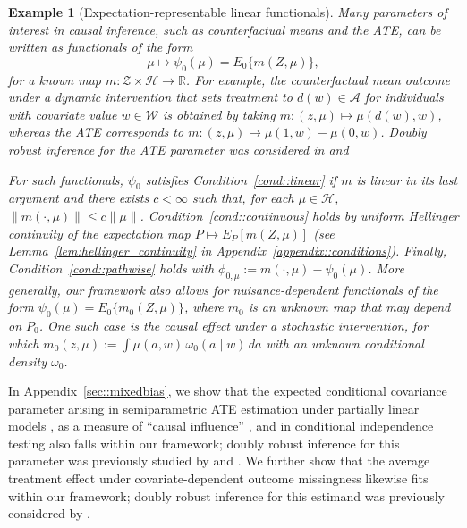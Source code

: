 \documentclass[11pt]{article}
\theoremstyle{plain}
\newtheorem{example}{Example}
\begin{document}
 
 
 {\color{purple}

\begin{example}[Expectation-representable linear functionals]
\label{example::expectfunctional}
Many parameters of interest in causal inference, such as counterfactual means and the ATE, can be written as functionals of the form \citep{chernozhukov2022automatic, bradic2019minimax, rotnitzky2021characterization}
\begin{equation}
    \mu \mapsto \psi_0(\mu) = E_0\{m(Z,\mu)\}, \label{eqn::simplefunctional}
\end{equation}
for a known map $m:\mathcal{Z}\times\mathcal{H}\to\mathbb{R}$. For example, the counterfactual mean outcome under a dynamic intervention that
sets treatment to $d(w)\in\mathcal{A}$ for individuals with covariate value
$w\in\mathcal{W}$ is obtained by taking $m:(z,\mu)\mapsto \mu(d(w),w)$, whereas
the ATE corresponds to $m:(z,\mu)\mapsto \mu(1,w)-\mu(0,w)$. Doubly robust inference for the ATE parameter was considered in \cite{van2014targeted} and \cite{benkeser2017doubly}


For such functionals, $\psi_0$ satisfies Condition~\ref{cond::linear} if $m$ is linear in its last argument and there exists $c<\infty$ such that, for each $\mu\in\mathcal{H}$, $\|m(\cdot,\mu)\|\le c\|\mu\|$. Condition~\ref{cond::continuous} holds by uniform Hellinger continuity of the expectation map $P \mapsto E_P[m(Z,\mu)]$ (see Lemma~\ref{lem:hellinger_continuity} in Appendix~\ref{appendix::conditions}). Finally, Condition~\ref{cond::pathwise} holds with $\phi_{0,\mu}:=m(\cdot,\mu)-\psi_0(\mu)$. More generally, our framework also allows for nuisance-dependent functionals of the form $\psi_0(\mu)=E_0\{m_0(Z,\mu)\}$, where $m_0$ is an unknown map that may depend on $P_0$. One such case is the causal effect under a stochastic intervention, for which $m_0(z,\mu) := \int \mu(a,w)\,\omega_0(a\mid w)\,da$ with an unknown conditional density $\omega_0$.
\end{example}

  }

In Appendix~\ref{sec::mixedbias}, we show that the expected conditional covariance parameter
arising in semiparametric ATE estimation under partially linear models
\citep{robinson1988root,li2011higher}, as a measure of ``causal influence''
\citep{diaz2024non}, and in conditional independence testing
\citep{shah2020hardness} also falls
within our framework; doubly robust inference for this parameter was previously
studied by \cite{dukes2024doubly} and \cite{bonvini2024doubly}. We further show
that the average treatment effect under covariate-dependent outcome missingness
likewise fits within our framework; doubly robust inference for this estimand
was previously considered by \cite{diaz2017doubly}.
\end{document}
